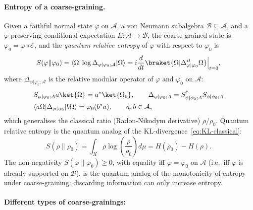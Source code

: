 \documentclass[a4paper,11pt]{article}
\theoremstyle{definition}
\newcommand{\mB}{\mathcal{B}}
\newcommand{\nn}{\nonumber}
\newcommand{\mE}{\mathcal{E}}
\begin{document}
\paragraph{Entropy of a coarse-graining.}
Given a faithful normal state $\varphi$ on $\mathcal{A}$, a von Neumann subalgebra
$\mathcal{B}\subseteq\mathcal{A}$, and a $\varphi$-preserving conditional expectation
$E:\mathcal{A}\to\mathcal{B}$, the coarse-grained state is
$\varphi_0 = \varphi\circ \mE$, and the \emph{quantum relative entropy} of $\varphi$ with
respect to $\varphi_0$ is
\begin{equation}
  S(\varphi\|\varphi_0) = \langle\Omega|\log\Delta_{\varphi|\varphi_0;\mathcal{A}} |\Omega\rangle=i\frac{d}{dt}\braket{\Omega|\Delta_{\varphi|\varphi_0}^{it}\Omega}\Big|_{t=0},
  \label{eq:relative-entropy}
\end{equation}
where $\Delta_{\varphi|\varphi_0;\mathcal{A}}$ is the relative modular operator of $\varphi$ and $\varphi_0$ on $\mathcal{A}$:
\begin{align}
  &S_{\varphi|\varphi_0;A}a\ket{\Omega}=a^*\ket{\Omega_0},\qquad \Delta_{\varphi|\varphi_0;A}=S^\dagger_{\phi|\phi_0;A}S_{\phi|\phi_0;A}\nn\\
  &\langle a\Omega|\Delta_{\varphi|\varphi_0}|b\Omega\rangle = \varphi_0(b^*a),
  \qquad a,b\in\mathcal{A},
  \label{eq:relative-modular}
\end{align}
which generalises the classical ratio (Radon-Nikodym derivative) $\rho/\rho_0$. Quantum relative entropy is the quantum analog of the KL-divergence~\eqref{eq:KL-classical}:
\begin{equation}
  S(\rho\|\rho_0) = \int_X \rho\log\!\left(\frac{\rho}{\rho_0}\right)d\mu = H(\rho_0)-H(\rho).
  \label{eq:classical-KL}
\end{equation}
The non-negativity $S(\varphi\|\varphi_0)\geq 0$, with equality iff $\varphi=\varphi_0$ on
$\mathcal{A}$ (i.e.\ iff $\varphi$ is already supported on $\mathcal{B}$), is the
quantum analog of the monotonicity of entropy under coarse-graining: discarding information
can only increase entropy.



\paragraph{Different types of coarse-grainings:}
\end{document}
